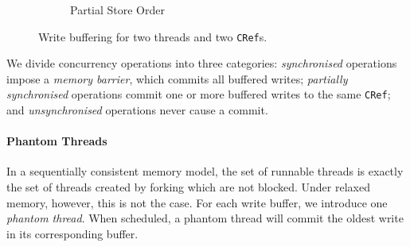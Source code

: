 \begin{figure}[t]
\begin{subfigure}[t]{0.3\textwidth}
    \caption{Partial Store Order}
  \end{subfigure}
  \caption{Write buffering for two threads and two \texttt{CRef}s.}
  \label{fig:wb}
\end{figure}

We divide concurrency operations into three categories: \emph{synchronised}
operations impose a \emph{memory barrier}, which commits all buffered writes;
\emph{partially synchronised} operations commit one or more buffered writes to
the same \verb|CRef|; and \emph{unsynchronised} operations never cause a commit.

\paragraph{Phantom Threads}
In a sequentially consistent memory model, the set of runnable threads is
exactly the set of threads created by forking which are not blocked.  Under
relaxed memory, however, this is not the case.  For each write buffer, we
introduce one \emph{phantom thread}.  When scheduled, a phantom thread will
commit the oldest write in its corresponding buffer.

